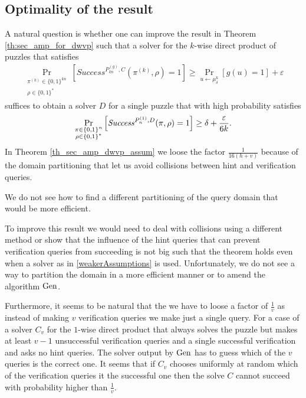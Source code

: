 \subsection{Optimality of the result}
\label{st:discussion}
A natural question is whether one can improve the result in Theorem \ref{th:sec_amp_for_dwvp} such that a solver
for the $k$-wise direct product of puzzles that satisfies
\begin{align}
    \label{weakerAssumptions}
    \underset{\substack{\pi^{(k)} \in \{0,1\}^{kn} \\ \rho \in \{0,1\}^{*}}}{\Pr}\left[\mathit{Success}^{P_{kn}^{(g)}, C}(\pi^{(k)}, \rho) = 1\right]
    \geq \underset{u \leftarrow \mu_\delta^k}{\Pr}[g(u) = 1] + \varepsilon
\end{align}
suffices to obtain a solver $D$ for a single puzzle that with high probability satisfies
  \begin{align}
    \underset{\substack{\pi \in \{0,1\}^{n} \\ \rho \in \{0,1\}^{*}}}
    {\Pr}\left[\operatorname{\mathit{Success}}^{P_{n}^{(1)},D}(\pi, \rho) = 1\right] \geq \delta + \frac{\varepsilon}{6k}.
  \end{align}
In Theorem \ref{th_sec_amp_dwvp_assum} we loose the factor $\frac{1}{16(h+v)}$ because of the domain partitioning that
let us avoid collisions between hint and verification queries.

We do not see how to find a different partitioning of the query domain that would be more efficient.

To improve this result we would need to deal with collisions using a different method or show that the influence of the hint queries that can prevent
verification queries from succeeding is not big such that the theorem holds even when a solver as in \ref{weakerAssumptions} is used.
Unfortunately, we do not see a way to partition the domain in a more efficient manner or to amend the algorithm $\operatorname{\text{Gen}}$.

Furthermore, it seems to be natural that the we have to loose a factor of $\frac{1}{v}$ as instead of making $v$ verification queries we make just a single query.
For a case of a solver $C_v$ for the $1$-wise direct product that always solves the puzzle but makes at least $v-1$ unsuccessful verification
queries and a single successful verification and asks no hint queries.
The solver output by $\operatorname{\text{Gen}}$ has to guess which of the $v$ queries is the correct one.
It seems that if $C_v$ chooses uniformly at random which of the verification queries it the successful one then the solve $C$ cannot succeed with
probability higher than $\frac{1}{v}$.

